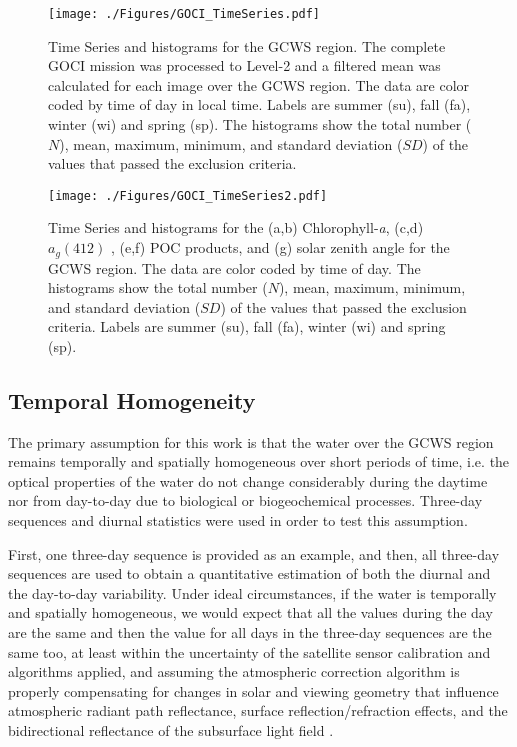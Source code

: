 \documentclass[remotesensing,article,submit,moreauthors,pdftex,10pt,a4paper]{Definitions/mdpi}
\begin{document}
\begin{figure}[htbp!]
  \centering
    \texttt{[image: ./Figures/GOCI\_TimeSeries.pdf]}
    \vspace{-0.5cm}
    \caption{Time Series and histograms for the GCWS region. The complete GOCI mission was processed to Level-2 and a filtered mean was calculated for each image over the GCWS region. The data are color coded by time of day in local time. Labels are summer (su), fall (fa), winter (wi) and spring (sp). The histograms show the total number ($N$), mean, maximum, minimum, and standard deviation ($SD$) of the values that passed the exclusion criteria. \label{fig:GOCI_TimeSeries} } 
\end{figure}
\begin{figure}[htbp!]

  \centering
    \texttt{[image: ./Figures/GOCI\_TimeSeries2.pdf]}
    \caption{Time Series and histograms for the (a,b) Chlorophyll-{\it a}, (c,d) $a_g(412)$ , (e,f) POC products, and (g) solar zenith angle for the GCWS region. The data are color coded by time of day. The histograms show the total number ($N$), mean, maximum, minimum, and standard deviation ($SD$) of the values that passed the exclusion criteria. Labels are summer (su), fall (fa), winter (wi) and spring (sp). \label{fig:GOCI_TimeSeries2} } 
\end{figure}
\subsection{Temporal Homogeneity}
The primary assumption for this work is that the water over the GCWS region remains temporally and spatially homogeneous over short periods of time, i.e. the optical properties of the water do not change considerably during the daytime nor from day-to-day due to biological or biogeochemical processes. Three-day sequences and diurnal statistics were used in order to test this assumption. 

First, one three-day sequence is provided as an example, and then, all three-day sequences are used to obtain a quantitative estimation of both the diurnal and the day-to-day variability. Under ideal circumstances, if the water is temporally and spatially homogeneous, we would expect that all the values during the day are the same and then the value for all days in the three-day sequences are the same too, at least within the uncertainty of the satellite sensor calibration and algorithms applied, and assuming the atmospheric correction algorithm is properly compensating for changes in solar and viewing geometry that influence atmospheric radiant path reflectance, surface reflection/refraction effects, and the bidirectional reflectance of the subsurface light field \cite{Mobley2016}. 
\end{document}
